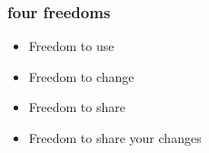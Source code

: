 \begin{frame} 
\frametitle{four freedoms}
%
%
%
% 
% 

\huge
\begin{center}
\begin{minipage}{7cm}
\begin{itemize}
	\item Freedom to \alert{use}
	\item Freedom to \alert{change}
	\item Freedom to \alert{share}
	\item Freedom to \alert{share your changes}
\end{itemize}
\end{minipage}
\end{center}

\end{frame} 

